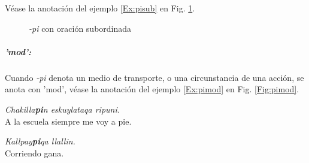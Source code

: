 \documentclass[a4paper,11pt,DIV12]{scrartcl}
\begin{document}
V\'ease la anotaci\'on del ejemplo \ref{Ex:pisub} en Fig. \ref{Fig:pisub}.


\begin{figure}
 \begin{center}
\end{center}
\caption{{\em -pi} con oraci\'on subordinada}\label{Fig:pisub}
\end{figure}


\subparagraph{'mod':}
Cuando {\em -pi} denota un medio de transporte, o una circunstancia de una acci\'on, se anota con 'mod', v\'ease la anotaci\'on del ejemplo \ref{Ex:pimod} en Fig. \ref{Fig:pimod}.
\begin{examples}
 \item\label{Ex:pimod} {\em Chakilla\textbf{pi}n eskuylataqa ripuni.}\\
	A la escuela siempre me voy a pie.\\
 \hfill {\small \citep[125]{Cusi2}}
  \item {\em Kallpay\textbf{pi}qa llallin.}\\
	Corriendo gana.\\
 \hfill {\small \citep[43]{Dedenbach02}}
\end{examples}
\end{document}

